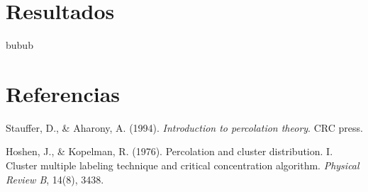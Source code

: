 \documentclass[10pt,twocolumn]{article}
\begin{document}
\section{Resultados} 
   bubub
    
   \section{Referencias}
   \begin{thebibliography}{99}
   
   Stauffer, D., \& Aharony, A. (1994). \textit{Introduction to percolation theory}. CRC press.
   
   Hoshen, J., \& Kopelman, R. (1976). Percolation and cluster distribution. I. Cluster multiple labeling technique and critical 
   concentration algorithm. \textit{Physical Review B}, 14(8), 3438.
   
   \end{thebibliography}
   
\end{document}
